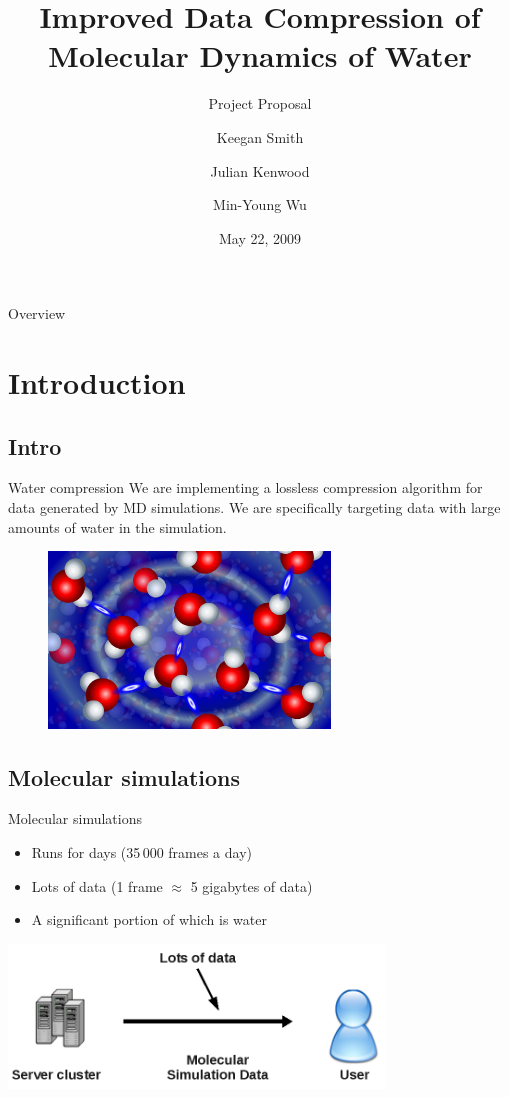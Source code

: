 \documentclass{beamer}
\title[Water Compression]{Improved Data Compression of Molecular Dynamics of
  Water}
\subtitle{Project Proposal}
\author{Keegan Smith
  \and Julian Kenwood
  \and Min-Young Wu}
\date{May 22, 2009}
\institute[UCT]{Department of Computer Science \\ University of Cape Town}
\begin{document}
\begin{frame}
  \titlepage
\end{frame}


\begin{frame}{Overview}
  \tableofcontents
\end{frame}

\section{Introduction}


\subsection{Intro}
\begin{frame}{Water compression}
  We are implementing a lossless compression algorithm for data generated by
  MD simulations. We are specifically targeting data with large amounts of
  water in the simulation.

  \begin{figure}
    \centering
    \includegraphics[width=75mm]{water_bonds.jpg}
  \end{figure}
\end{frame}


\subsection{Molecular simulations}
\begin{frame}{Molecular simulations}
 \begin{itemize}
  \item Runs for days (35\,000 frames a day)
  \item Lots of data (1 frame $\approx$ 5 gigabytes of data)
  \item A significant portion of which is water
 \end{itemize}
  \includegraphics[width=100mm]{data.png}
\end{frame}
\end{document}
